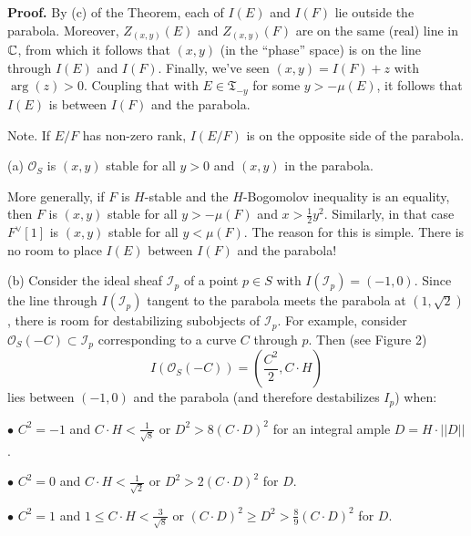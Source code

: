 \documentclass{amsart}
\begin{document}
{\bf Proof.} By (c) of the Theorem, each of $I(E)$ and $I(F)$ lie outside the parabola. Moreover, $Z_{(x,y)}(E)$ and $Z_{(x,y)}(F)$ are on the same (real) line in ${\mathbb C}$, from 
which it follows that $(x,y)$ (in the ``phase'' space) is on the line through $I(E)$ and $I(F)$. Finally, we've seen $(x,y) = I(F) + z$ with $\arg(z) > 0$. Coupling that with 
$E \in {\mathfrak T}_{-y}$ for some
$y > -\mu(E)$, it follows that $I(E)$ is between $I(F)$ and the parabola. 

\medskip

\nt Note. If $E/F$ has non-zero rank, $I(E/F)$ is on the opposite side of the parabola. 

\medskip

 (a) ${\mathcal O}_S$  is $(x,y)$ stable for all $y > 0$ and $(x,y)$ in the parabola. 

\medskip

More generally, if $F$ is $H$-stable and the $H$-Bogomolov inequality is an equality, 
then $F$ is $(x,y)$ stable for all 
$y > -\mu(F)$ and $x > \frac 12y^2$. Similarly, in that case $F^\vee[1]$ is $(x,y)$ stable for 
all $y < \mu(F)$. The reason for this is simple. There is no room to place $I(E)$ between $I(F)$ and the parabola!

\medskip

(b) Consider the ideal sheaf ${\mathcal I}_p$ of a point $p \in S$ with $I({\mathcal I}_p) = (-1,0)$. 
Since the line through $I({\mathcal I}_p)$ tangent to the parabola meets the parabola at $(1,\sqrt 2)$, 
there is room for destabilizing subobjects of ${\mathcal I}_p$. 
For example, consider ${\mathcal O}_S(-C) \subset {\mathcal I}_p$ corresponding to a curve $C$ through $p$. Then (see Figure 2)
\[ I({\mathcal O}_S(-C)) = \left( \frac{C^2}2, C \cdot H \right) \] 
lies between $(-1,0)$ and the parabola (and therefore destabilizes $I_p$) when: 

\medskip

$\bullet$ $C^2 = -1$ and $C \cdot H < \frac 1{\sqrt 8}$ or $D^2 > 8(C\cdot D)^2$ for an integral ample $D = H \cdot ||D||$.

\medskip

$\bullet$ $C^2 = 0$ and $C \cdot H < \frac 1{\sqrt 2}$ or $D^2 > 2(C \cdot D)^2$ for $D$. 

\medskip

$\bullet$ $C^2 = 1$ and $1 \le C\cdot H < \frac 3{\sqrt 8}$ or $(C \cdot D)^2  \ge D^2  > \frac 89 (C\cdot D)^2$ for $D$. 

\medskip
\end{document}
